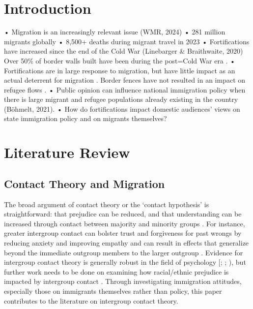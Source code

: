 \documentclass[12pt,]{article}
\begin{document}
\noindent \doublespacing \section{Introduction}\label{introduction}

• Migration is an increasingly relevant issue (WMR, 2024) • 281 million
migrants globally • 8,500+ deaths during migrant travel in 2023 •
Fortifications have increased since the end of the Cold War (Linebarger
\& Braithwaite, 2020) Over 50\% of border walls built have been during
the post=Cold War era \citep{carter2017}. • Fortifications are in large
response to migration, but have little impact as an actual deterrent for
migration \citep{avdan2023}. Border fences have not resulted in an
impact on refugee flows \citep{avdan2023}. • Public opinion can
influence national immigration policy when there is large migrant and
refugee populations already existing in the country (Böhmelt, 2021). •
How do fortifications impact domestic audiences' views on state
immigration policy and on migrants themselves?

\section{Literature Review}\label{literature-review}

\subsection{Contact Theory and
Migration}\label{contact-theory-and-migration}

The broad argument of contact theory or the `contact hypothesis' is
straightforward: that prejudice can be reduced, and that understanding
can be increased through contact between majority and minority groups
\citep{pettigrew2006, allport1970}. For instance, greater intergroup
contact can bolster trust and forgiveness for past wrongs by reducing
anxiety and improving empathy and can result in effects that generalize
beyond the immediate outgroup members to the larger outgroup
\citep{pettigrew2011}. Evidence for intergroup contact theory is
generally robust in the field of psychology {[}\citet{pettigrew2006};
\citet{paluck2019}; \citet{pettigrew2011}), but further work needs to be
done on examining how racial/ethnic prejudice is impacted by intergroup
contact \citep{paluck2019}. Through investigating immigration attitudes,
especially those on immigrants themselves rather than policy, this paper
contributes to the literature on intergroup contact theory.
\end{document}
